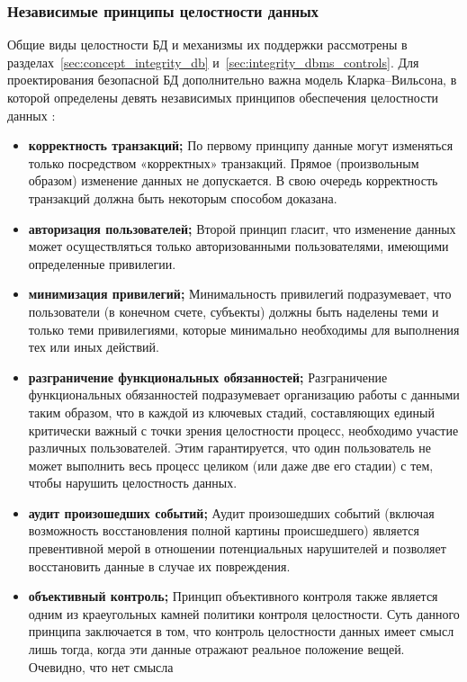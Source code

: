 \subsubsection{Независимые принципы целостности данных}
Общие виды целостности БД и механизмы их поддержки рассмотрены в разделах~\ref{sec:concept_integrity_db}
и~\ref{sec:integrity_dbms_controls}. Для проектирования безопасной БД дополнительно важна модель
Кларка--Вильсона, в которой определены девять независимых принципов обеспечения целостности данных
\autocite{Vorobyova}:
\begin{itemize}
    \item \textbf{корректность транзакций;}
    По первому принципу данные могут изменяться только посредством «корректных» транзакций.
    Прямое (произвольным образом) изменение данных не допускается. В свою очередь
    корректность транзакций должна быть некоторым способом доказана.
    \item \textbf{авторизация пользователей;}
    Второй принцип гласит, что изменение данных может осуществляться только
    авторизованными пользователями, имеющими определенные привилегии.
    \item \textbf{минимизация привилегий;}
    Минимальность привилегий подразумевает, что пользователи (в конечном счете, субъекты)
    должны быть наделены теми и только теми привилегиями, которые минимально необходимы
    для выполнения тех или иных действий.
    \item \textbf{разграничение функциональных обязанностей;}
    Разграничение функциональных обязанностей подразумевает организацию работы с данными
    таким образом, что в каждой из ключевых стадий, составляющих единый критически важный
    с точки зрения целостности процесс, необходимо участие различных пользователей.
    Этим гарантируется, что один пользователь не может выполнить весь процесс целиком
    (или даже две его стадии) с тем, чтобы нарушить целостность данных.
    \item \textbf{аудит произошедших событий;}
    Аудит произошедших событий (включая возможность восстановления полной картины происшедшего)
    является превентивной мерой в отношении потенциальных нарушителей и позволяет
    восстановить данные в случае их повреждения.
    \item \textbf{объективный контроль;}
    Принцип объективного контроля также является одним из краеугольных камней политики контроля
    целостности. Суть данного принципа заключается в том, что контроль целостности данных имеет
    смысл лишь тогда, когда эти данные отражают реальное положение вещей. Очевидно, что нет смысла

\end{itemize}
